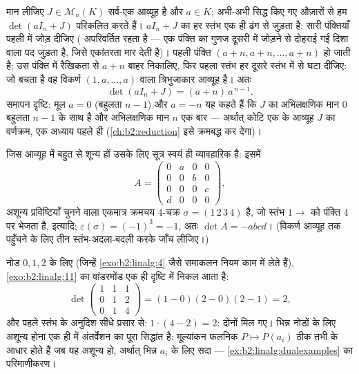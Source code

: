 \begin{example}[नियमों के सहारे एक सारणिक]\label{ex:b2:linalg:onesmatrix}
मान लीजिए $J \in \mathcal{M}_n(K)$ सर्व-एक आव्यूह है और $a \in K$; अभी-अभी सिद्ध किए गए औज़ारों
से हम $\det(aI_n + J)$ परिकलित करते हैं। $aI_n + J$ का हर स्तंभ एक ही ढंग से जुड़ता है:
सारी पंक्तियाँ पहली में जोड़ दीजिए ( अपरिवर्तित रहता है --- एक
पंक्ति का गुणज दूसरी में जोड़ने से दोहराई गई दिशा वाला पद जुड़ता है,
जिसे एकांतरता मार देती है)। पहली पंक्ति $(a + n, a + n, \dots, a + n)$ हो जाती है; उस पंक्ति में
रैखिकता से $a + n$ बाहर निकालिए, फिर पहला स्तंभ हर दूसरे स्तंभ में से घटा
दीजिए: जो बचता है वह विकर्ण $(1, a, \dots, a)$ वाला त्रिभुजाकार आव्यूह है। अतः
\[
\det(aI_n + J) = (a + n)\,a^{\,n-1}.
\]
समापन दृष्टि: मूल $a = 0$ (बहुलता $n - 1$) और $a = -n$ यह कहते हैं कि $J$ का
अभिलक्षणिक मान $0$ बहुलता $n - 1$ के साथ है और अभिलक्षणिक मान $n$ एक
बार --- अर्थात् कोटि एक के आव्यूह $J$ का वर्णक्रम, एक अध्याय पहले ही
(\cref{ch:b2:reduction} इसे क्रमबद्ध कर देगा)।
\end{example}

\begin{example}[क्रमचय सूत्र से एक सारणिक]\label{ex:b2:linalg:permexample}
जिस आव्यूह में बहुत से शून्य हों उसके लिए सूत्र स्वयं ही व्यावहारिक
है: इसमें
\[
A = \begin{pmatrix}
0 & a & 0 & 0\\
0 & 0 & b & 0\\
0 & 0 & 0 & c\\
d & 0 & 0 & 0
\end{pmatrix},
\]
अशून्य प्रविष्टियाँ चुनने वाला एकमात्र क्रमचय $4$-चक्र $\sigma = (1\,2\,3\,4)$ है, जो
स्तंभ $1 \to$ को पंक्ति $4$ पर भेजता है, इत्यादि; $\varepsilon(\sigma) = (-1)^3 = -1$, अतः $\det A = -abcd$। (विकर्ण
आव्यूह तक पहुँचने के लिए तीन स्तंभ-अदला-बदली करके जाँच लीजिए।)
\end{example}

\begin{example}\label{ex:b2:linalg:vandermondework}
नोड $0, 1, 2$ के लिए (जिन्हें \cref{exo:b2:linalg:4} जैसे समाकलन नियम काम में लेते हैं), \cref{exo:b2:linalg:11}
का वांडरमोंड  एक ही दृष्टि में निकल आता है:
\[
\det\begin{pmatrix}
1 & 1 & 1\\
0 & 1 & 2\\
0 & 1 & 4
\end{pmatrix}
= (1 - 0)(2 - 0)(2 - 1) = 2 ,
\]
और पहले स्तंभ के अनुदिश सीधे प्रसार से: $1\cdot(4 - 2)
= 2$: दोनों मिल गए। भिन्न
नोडों के लिए अशून्य होना एक ही  में अंतर्वेशन का पूरा सिद्धांत
है: मूल्यांकन फलनिक $P \mapsto P(a_i)$ ठीक तभी  के आधार होते हैं जब यह 
अशून्य हो, अर्थात् भिन्न $a_i$ के लिए सदा --- \cref{ex:b2:linalg:dualexamples} का परिमाणीकरण।
\end{example}

